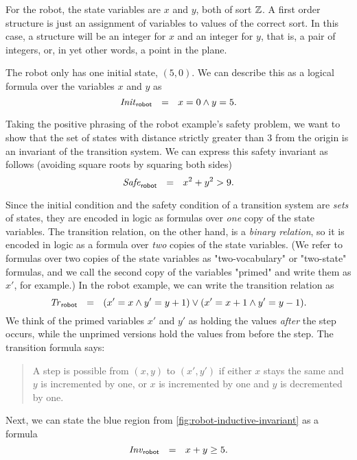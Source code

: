For the robot, the state variables are $x$ and $y$,
  both of sort $\mathbb{Z}$.
A first order structure is just
  an assignment of variables to values of the correct sort.
In this case, a structure will be an integer for $x$ and an integer for $y$,
  that is, a pair of integers, or, in yet other words, a point in the plane.

The robot only has one initial state, $(5, 0)$.
We can describe this as a logical formula over the variables $x$ and $y$ as
\[
  \mathit{Init}_{\mathsf{robot}} ~~=~~ x = 0 \land y = 5.
\]

Taking the positive phrasing of the robot example's safety problem,
  we want to show that the set of states
  with distance strictly greater than 3 from the origin
  is an invariant of the transition system.
We can express this safety invariant as follows 
  (avoiding square roots by squaring both sides)
\[
  \mathit{Safe}_{\mathsf{robot}} ~~=~~ x^2 + y^2 > 9.
\]

Since the initial condition and the safety condition 
  of a transition system are \emph{sets} of states,
  they are encoded in logic as formulas over \emph{one} copy of the state variables.
The transition relation, on the other hand, is a \emph{binary relation},
  so it is encoded in logic as a formula over \emph{two} copies of the state variables.
(We refer to formulas over two copies of the state variables as
  "two-vocabulary" or "two-state" formulas, 
  and we call the second copy of the variables "primed" 
  and write them as $x'$, for example.)
In the robot example, we can write the transition relation as
\[
    \mathit{Tr}_{\mathsf{robot}} ~~=~~ (x' = x \land y' = y + 1) \lor (x' = x + 1 \land y' = y - 1).
\]
We think of the primed variables $x'$ and $y'$ as
  holding the values \emph{after} the step occurs,
while the unprimed versions hold the values from before the step.
The transition formula says:
\begin{quote}
  A step is possible from $(x, y)$ to $(x', y')$ if
    either $x$ stays the same and $y$ is incremented by one,
    or $x$ is incremented by one and $y$ is decremented by one.
\end{quote}

Next, we can state the blue region from \cref{fig:robot-inductive-invariant}
  as a formula
\[
  \mathit{Inv}_{\mathsf{robot}} ~~=~~ x + y \ge 5.
\]

